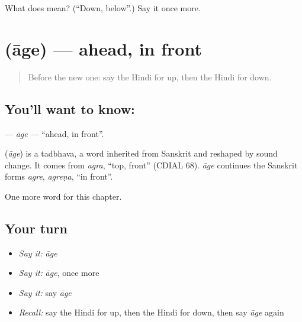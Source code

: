 \begin{tcolorbox}[breakable,colback=teal!4,colframe=teal!35!black,title={Before you move on}]
What does  mean? (\textquotedblleft{}Down, below\textquotedblright{}.) Say it once more.
\end{tcolorbox}
\section[\texorpdfstring{\hi{आगे} (āge)}{आगे (āge)}]{ (āge) — ahead, in front}

\label{lesson:HI-C235-age}



\begin{quote}
Before the new one: say the Hindi for up, then the Hindi for down.
\end{quote}

\subsection*{You'll want to know: }
\textbf{} — \emph{āge} — \textquotedblleft{}ahead, in front\textquotedblright{}.

\begin{cousinweb}
\textbf{} (\emph{āge}) is a tadbhava, a word inherited from Sanskrit and reshaped by sound change. It comes from \emph{agra}, \textquotedblleft{}top, front\textquotedblright{} (CDIAL 68). \emph{āge} continues the Sanskrit forms \emph{agre}, \emph{agreṇa}, \textquotedblleft{}in front\textquotedblright{}.
\end{cousinweb}

\begin{grammarlens}[title={What you've built}]
One more word for this chapter.
\end{grammarlens}

\subsection*{Your turn}
\begin{itemize}
\raggedright
  \item \emph{Say it:} \emph{āge}
  \item \emph{Say it:} \emph{āge}, once more
  \item \emph{Say it:} say \emph{āge}
  \item \emph{Recall:} say the Hindi for up, then the Hindi for down, then say \emph{āge} again
\end{itemize}

